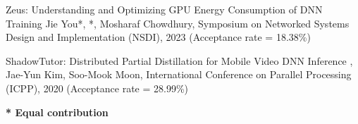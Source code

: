 



\begin{cvlist}

  \cvlistitem
    {Zeus: Understanding and Optimizing GPU Energy Consumption of DNN Training} %
    {Jie You*, *, Mosharaf Chowdhury, Symposium on Networked Systems Design and Implementation (NSDI), 2023 (Acceptance rate = 18.38\%)} %

  \cvlistitem
    {ShadowTutor: Distributed Partial Distillation for Mobile Video DNN Inference} %
    {, Jae-Yun Kim, Soo-Mook Moon, International Conference on Parallel Processing (ICPP), 2020 (Acceptance rate = 28.99\%)} %

\end{cvlist}

\vspace{-5mm}
\begin{cvparagraph}
  \textbf{* Equal contribution}
\end{cvparagraph}
